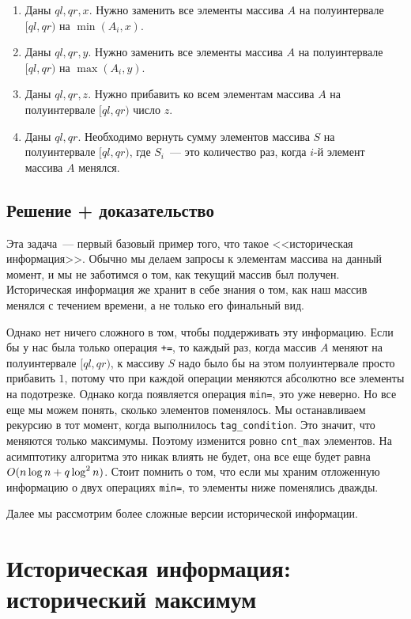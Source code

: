 \begin{enumerate}
    \item Даны $ql, qr, x$. Нужно заменить все элементы массива $A$ на полуинтервале $[ql, qr)$ на $\min(A_i, x)$.
    \item Даны $ql, qr, y$. Нужно заменить все элементы массива $A$ на полуинтервале $[ql, qr)$ на $\max(A_i, y)$.
    \item Даны $ql, qr, z$. Нужно прибавить ко всем элементам массива $A$ на полуинтервале $[ql, qr)$ число $z$.
    \item Даны $ql, qr$. Необходимо вернуть сумму элементов массива $S$ на полуинтервале $[ql, qr)$, где $S_i$~--- это количество раз, когда $i$-й элемент массива $A$ менялся.
\end{enumerate}

\subsection{Решение + доказательство}

Эта задача~--- первый базовый пример того, что такое <<историческая информация>>. Обычно мы делаем запросы к элементам массива на данный момент, и мы не заботимся о том, как текущий массив был получен. Историческая информация же хранит в себе знания о том, как наш массив менялся с течением времени, а не только его финальный вид.

Однако нет ничего сложного в том, чтобы поддерживать эту информацию. Если бы у нас была только операция \verb^+=^, то каждый раз, когда массив $A$ меняют на полуинтервале $[ql, qr)$, к массиву $S$ надо было бы на этом полуинтервале просто прибавить $1$, потому что при каждой операции меняются абсолютно все элементы на подотрезке. Однако когда появляется операция \verb+min=+, это уже неверно. Но все еще мы можем понять, сколько элементов поменялось. Мы останавливаем рекурсию в тот момент, когда выполнилось \verb+tag_condition+. Это значит, что меняются только максимумы. Поэтому изменится ровно \verb+cnt_max+ элементов. На асимптотику алгоритма это никак влиять не будет, она все еще будет равна $O(n \log n + q \log^2 n)$. Стоит помнить о том, что если мы храним отложенную информацию о двух операциях \verb+min=+, то элементы ниже поменялись дважды.

Далее мы рассмотрим более сложные версии исторической информации.








\cprotect \section{Историческая информация: исторический максимум}

